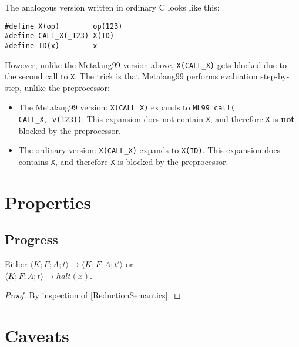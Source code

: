 \documentclass[12pt]{article}
\theoremstyle{break}
\begin{document}
The analogous version written in ordinary C looks like this:

\begin{verbatim}
#define X(op)        op(123)
#define CALL_X(_123) X(ID)
#define ID(x)        x
\end{verbatim}

However, unlike the Metalang99 version above, \texttt{X(CALL\_X)} gets blocked \cite{Bluepainting} due to the
second call to \texttt{X}. The trick is that Metalang99 performs evaluation step-by-step,
unlike the preprocessor:

\begin{itemize}
    \item The Metalang99 version: \texttt{X(CALL\_X)} expands to \texttt{ML99\_call(\\ CALL\_X, v(123))}.
    This expansion does not contain \texttt{X}, and therefore \texttt{X} is \textbf{not}
    blocked by the preprocessor.

    \item The ordinary version: \texttt{X(CALL\_X)} expands to \texttt{X(ID)}. This expansion
    does contains \texttt{X}, and therefore \texttt{X} is blocked by the preprocessor.
\end{itemize}

\section{Properties}

\subsection{Progress}

\begin{proposition}[Progress]
Either $\langle K; F; A; \overline{t} \rangle \to \langle K; F; A; \overline{t'} \rangle$ or \\
$\langle K; F; A; \overline{t} \rangle \to halt(\overline{x})$.
\end{proposition}

\begin{proof}
By inspection of \ref{ReductionSemantics}.
\end{proof}

\section{Caveats}
\end{document}
